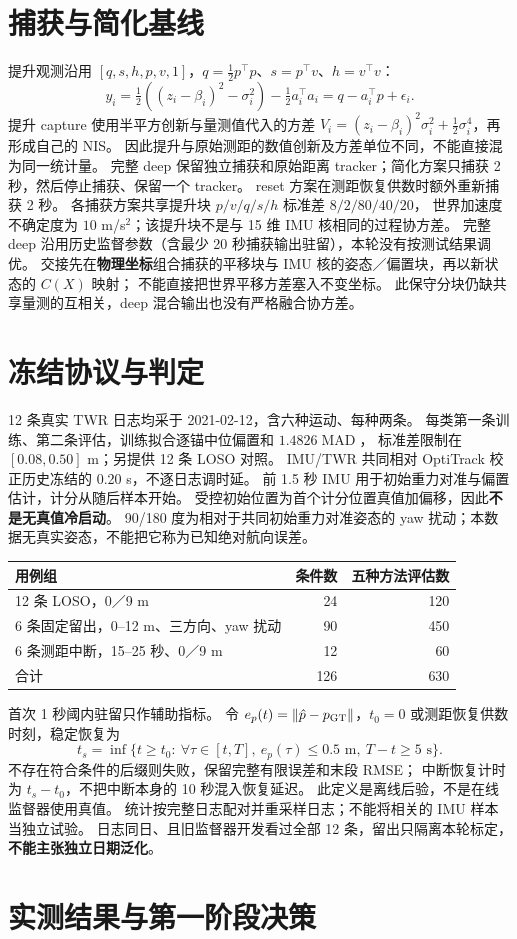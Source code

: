\documentclass[11pt,a4paper]{ctexart}
\begin{document}
\section{捕获与简化基线}
提升观测沿用 $[q,s,h,p,v,1]$，$q=\frac12p^\top p$、$s=p^\top v$、$h=v^\top v$：
\begin{equation}
y_i=\tfrac12((z_i-\beta_i)^2-\sigma_i^2)-\tfrac12 a_i^\top a_i
=q-a_i^\top p+\epsilon_i.
\end{equation}
提升 capture 使用半平方创新与量测值代入的方差
$V_i=(z_i-\beta_i)^2\sigma_i^2+\tfrac12\sigma_i^4$，再形成自己的 NIS。
因此提升与原始测距的数值创新及方差单位不同，不能直接混为同一统计量。
完整 deep 保留独立捕获和原始距离 tracker；简化方案只捕获 2 秒，然后停止捕获、保留一个 tracker。
reset 方案在测距恢复供数时额外重新捕获 2 秒。
各捕获方案共享提升块 $p/v/q/s/h$ 标准差 $8/2/80/40/20$，
世界加速度不确定度为 $10$ m/s$^2$；该提升块不是与 15 维 IMU 核相同的过程协方差。
完整 deep 沿用历史监督参数（含最少 20 秒捕获输出驻留），本轮没有按测试结果调优。
交接先在\textbf{物理坐标}组合捕获的平移块与 IMU 核的姿态／偏置块，再以新状态的 $C(X)$ 映射；
不能直接把世界平移方差塞入不变坐标。
此保守分块仍缺共享量测的互相关，deep 混合输出也没有严格融合协方差。

\section{冻结协议与判定}
12 条真实 TWR 日志均采于 2021-02-12，含六种运动、每种两条。
每类第一条训练、第二条评估，训练拟合逐锚中位偏置和 $1.4826\operatorname{MAD}$，
标准差限制在 $[0.08,0.50]$ m；另提供 12 条 LOSO 对照。
IMU/TWR 共同相对 OptiTrack 校正历史冻结的 0.20 s，不逐日志调时延。
前 1.5 秒 IMU 用于初始重力对准与偏置估计，计分从随后样本开始。
受控初始位置为首个计分位置真值加偏移，因此\textbf{不是无真值冷启动}。
90/180 度为相对于共同初始重力对准姿态的 yaw 扰动；本数据无真实姿态，不能把它称为已知绝对航向误差。

\begin{center}
\begin{tabular}{lrr}
\toprule
用例组&条件数&五种方法评估数\\\midrule
12 条 LOSO，0／9 m&24&120\\
6 条固定留出，0--12 m、三方向、yaw 扰动&90&450\\
6 条测距中断，15--25 秒、0／9 m&12&60\\\midrule
合计&126&630\\\bottomrule
\end{tabular}
\end{center}
首次 1 秒阈内驻留只作辅助指标。
令 $e_p(t)=\|\hat p-p_{\rm GT}\|$，$t_0=0$ 或测距恢复供数时刻，稳定恢复为
\begin{equation}
t_s=\inf\{t\ge t_0:\ \forall \tau\in[t,T],\ e_p(\tau)\le0.5\text{ m},\ T-t\ge5\text{ s}\}.
\end{equation}
不存在符合条件的后缀则失败，保留完整有限误差和末段 RMSE；
中断恢复计时为 $t_s-t_0$，不把中断本身的 10 秒混入恢复延迟。
此定义是离线后验，不是在线监督器使用真值。
统计按完整日志配对并重采样日志；不能将相关的 IMU 样本当独立试验。
日志同日、且旧监督器开发看过全部 12 条，留出只隔离本轮标定，\textbf{不能主张独立日期泛化}。

\section{实测结果与第一阶段决策}

\end{document}

